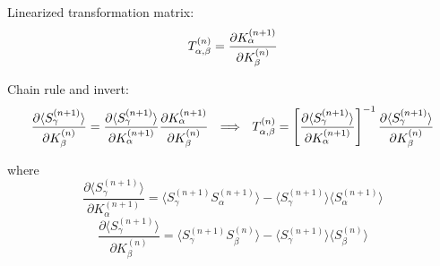 \documentclass[12pt]{article}
\begin{document}
Linearized transformation matrix:
\begin{equation}
T_{\alpha, \beta}^{(n)} = \frac{\partial K_\alpha^{(n+1)}}{\partial K_\beta^{(n)}}\\
\end{equation}

Chain rule and invert:
\begin{equation}
\frac{\partial \langle S_\gamma^{(n+1)} \rangle}{\partial K_\beta^{(n)}}
= \frac{\partial \langle S_\gamma^{(n+1)} \rangle}{\partial K_\alpha^{(n+1)}}
\frac{\partial K_\alpha^{(n+1)}}{\partial K_\beta^{(n)}} 
\ \ \Longrightarrow \ \ 
T_{\alpha, \beta}^{(n)} 
= \left[ \frac{\partial \langle S_\gamma^{(n+1)} \rangle}{\partial K_\alpha^{(n+1)}} \right]^{-1} \frac{\partial \langle S_\gamma^{(n+1)} \rangle}{\partial K_\beta^{(n)}} \\ 
\end{equation}

where
\begin{equation}
\frac{\partial \langle S_\gamma^{(n+1)} \rangle}{\partial K_\alpha^{(n+1)}}  
=  \Big\langle S_\gamma^{(n+1)} S_\alpha^{(n+1)} \Big\rangle
- \Big\langle S_\gamma^{(n+1)}  \Big\rangle 
\Big\langle  S_\alpha^{(n+1)}  \Big\rangle
\end{equation}
\begin{equation}
\frac{\partial \langle S_\gamma^{(n+1)} \rangle}{\partial K_\beta^{(n)}}  
=  \Big\langle S_\gamma^{(n+1)} S_\beta^{(n)} \Big\rangle
- \Big\langle S_\gamma^{(n+1)}  \Big\rangle 
\Big\langle  S_\beta^{(n)}  \Big\rangle
\end{equation}
\end{document}
